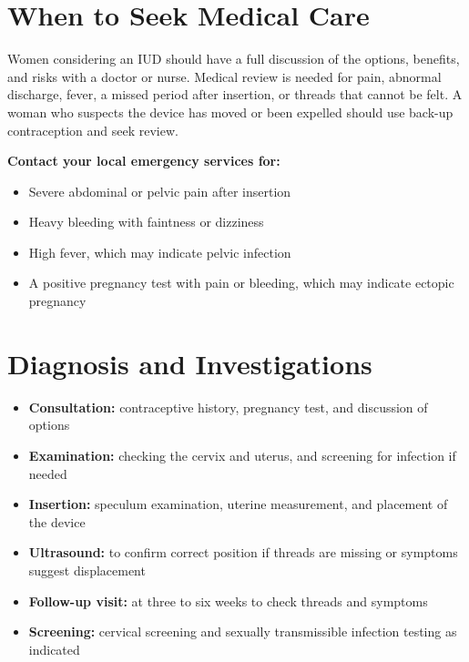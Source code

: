 \section*{When to Seek Medical Care}
Women considering an IUD should have a full discussion of the options, benefits, and risks with a doctor or nurse. Medical review is needed for pain, abnormal discharge, fever, a missed period after insertion, or threads that cannot be felt. A woman who suspects the device has moved or been expelled should use back-up contraception and seek review.

\textbf{Contact your local emergency services for:}
\begin{itemize}
    \item Severe abdominal or pelvic pain after insertion
    \item Heavy bleeding with faintness or dizziness
    \item High fever, which may indicate pelvic infection
    \item A positive pregnancy test with pain or bleeding, which may indicate ectopic pregnancy
\end{itemize}

\section*{Diagnosis and Investigations}
\begin{itemize}
    \item \textbf{Consultation:} contraceptive history, pregnancy test, and discussion of options
    \item \textbf{Examination:} checking the cervix and uterus, and screening for infection if needed
    \item \textbf{Insertion:} speculum examination, uterine measurement, and placement of the device
    \item \textbf{Ultrasound:} to confirm correct position if threads are missing or symptoms suggest displacement
    \item \textbf{Follow-up visit:} at three to six weeks to check threads and symptoms
    \item \textbf{Screening:} cervical screening and sexually transmissible infection testing as indicated
\end{itemize}


